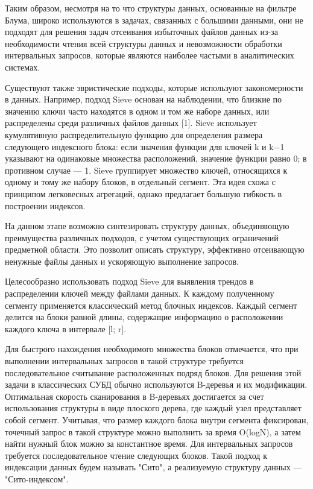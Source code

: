 Таким образом, несмотря на то что структуры данных, основанные на фильтре Блума, широко используются в задачах, связанных с большими данными, они не подходят для решения задач отсеивания избыточных файлов данных из-за необходимости чтения всей структуры данных и невозможности обработки интервальных запросов, которые являются наиболее частыми в аналитических системах.



Существуют также эвристические подходы, которые используют закономерности в данных. Например, подход Sieve основан на наблюдении, что близкие по значению ключи часто находятся в одном и том же наборе данных, или распределены среди различных файлов данных [1]. Sieve использует кумулятивную распределительную функцию для определения размера следующего индексного блока: если значения функции для ключей k и k−1 указывают на одинаковые множества расположений, значение функции равно 0; в противном случае — 1. Sieve группирует множество ключей, относящихся к одному и тому же набору блоков, в отдельный сегмент. Эта идея схожа с принципом легковесных агрегаций, однако предлагает большую гибкость в построении индексов.

На данном этапе возможно синтезировать структуру данных, объединяющую преимущества различных подходов, с учетом существующих ограничений предметной области. Это позволит описать структуру, эффективно отсеивающую ненужные файлы данных и ускоряющую выполнение запросов.

Целесообразно использовать подход Sieve для выявления трендов в распределении ключей между файлами данных. К каждому полученному сегменту применяется классический метод блочных индексов. Каждый сегмент делится на блоки равной длины, содержащие информацию о расположении каждого ключа в интервале [l; r].

Для быстрого нахождения необходимого множества блоков отмечается, что при выполнении интервальных запросов в такой структуре требуется последовательное считывание расположенных подряд блоков. Для решения этой задачи в классических СУБД обычно используются B-деревья и их модификации. Оптимальная скорость сканирования в B-деревьях достигается за счет использования структуры в виде плоского дерева, где каждый узел представляет собой сегмент. Учитывая, что размер каждого блока внутри сегмента фиксирован, точечный запрос в такой структуре можно выполнить за время O(logN), а затем найти нужный блок можно за константное время. Для интервальных запросов требуется последовательное чтение следующих блоков. Такой подход к индексации данных будем называть "Сито", а реализуемую структуру данных — "Сито-индексом".

